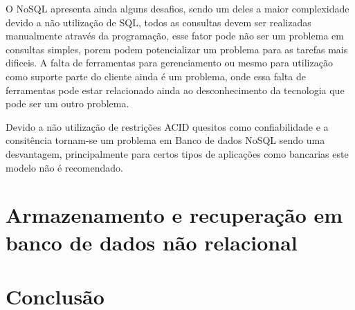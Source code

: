 \documentclass[12pt]{article}
\begin{document}
O NoSQL apresenta ainda alguns desafios, sendo um deles a maior complexidade devido a não utilização de SQL, todos as consultas devem ser realizadas manualmente através da programação, esse fator pode não ser um problema em consultas simples, porem podem potencializar um problema para as tarefas mais dificeis. A falta de ferramentas para gerenciamento ou mesmo para utilização como suporte parte do cliente ainda é um problema, onde essa falta de ferramentas pode estar relacionado ainda ao desconhecimento da tecnologia que pode ser um outro problema.\cite{leavitt:2010}

Devido a não utilização de restrições ACID quesitos como confiabilidade e a consitência tornam-se um problema em Banco de dados NoSQL sendo uma desvantagem, principalmente para certos tipos de aplicações como bancarias este modelo não é recomendado.\cite{leavitt:2010}

\section{Armazenamento e recuperação em banco de dados não relacional}









\section{Conclusão}
\label{sec:conclusao}



\end{document}
